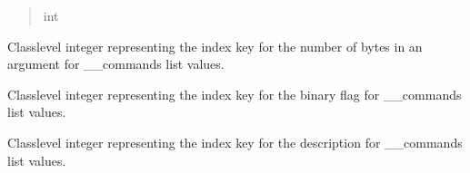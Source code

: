 \documentclass[letterpaper,10pt,english]{sphinxmanual}
\begin{document}
\begin{fulllineitems}
\begin{fulllineitems}
\begin{quote}
\begin{description}
\sphinxAtStartPar
int

\end{description}\end{quote}

\end{fulllineitems}


\begin{fulllineitems}
\label{\detokenize{PodCommands:PodCommands.POD_Commands.__ARGUMENTS}}
\pysigstartsignatures
{}
\pysigstopsignatures
\sphinxAtStartPar
Class\sphinxhyphen{}level integer representing the index key for the number of bytes in an     argument for \_\_commands list values.

\end{fulllineitems}


\begin{fulllineitems}
\label{\detokenize{PodCommands:PodCommands.POD_Commands.__BINARY}}
\pysigstartsignatures
{}
\pysigstopsignatures
\sphinxAtStartPar
Class\sphinxhyphen{}level integer representing the index key for the binary flag for \_\_commands     list values.

\end{fulllineitems}


\begin{fulllineitems}
\label{\detokenize{PodCommands:PodCommands.POD_Commands.__DESCRIPTION}}
\pysigstartsignatures
{}
\pysigstopsignatures
\sphinxAtStartPar
Class\sphinxhyphen{}level integer representing the index key for the description for \_\_commands     list values.


\end{fulllineitems}
\end{fulllineitems}
\end{document}
